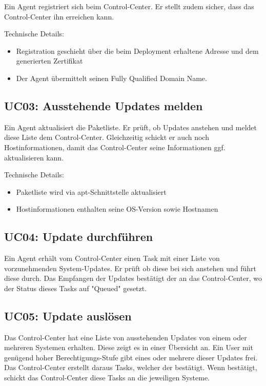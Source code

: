 Ein Agent registriert sich beim Control-Center. Er stellt zudem sicher, dass das Control-Center ihn erreichen kann.
 

Technische Details:

\begin{itemize}
    \item Registration geschieht über die beim Deployment erhaltene Adresse und dem generierten Zertifikat
    \item Der Agent übermittelt seinen Fully Qualified Domain Name.
\end{itemize}

\subsection*{UC03: Ausstehende Updates melden}
\label{sec:uc_03}

Ein Agent aktualisiert die Paketliste. Er prüft, ob Updates anstehen und meldet diese Liste dem Control-Center. Gleichzeitig schickt er auch noch Hostinformationen, damit das Control-Center seine Informationen ggf. aktualisieren kann.
 

Technische Details:

\begin{itemize}
    \item Paketliste wird via apt-Schnittstelle aktualisiert
    \item Hostinformationen enthalten seine OS-Version sowie Hostnamen
\end{itemize}

\subsection*{UC04: Update durchführen}
\label{sec:uc_04}

Ein Agent erhält vom Control-Center einen Task mit einer Liste von vorzunehmenden System-Updates. Er prüft ob diese bei sich anstehen und führt diese durch. Das Empfangen der Updates bestätigt der an das Control-Center, wo der Status dieses Tasks auf "Queued" gesetzt.

\subsection*{UC05: Update auslösen}
\label{sec:uc_05}

Das Control-Center hat eine Liste von ausstehenden Updates von einem oder mehreren Systemen erhalten. Diese zeigt es in einer Übersicht an. Ein User mit genügend hoher Berechtigungs-Stufe gibt eines oder mehrere dieser Updates frei. Das Control-Center erstellt daraus Tasks, welcher der bestätigt. Wenn bestätigt, schickt das Control-Center diese Tasks an die jeweiligen Systeme.

